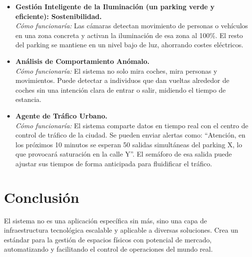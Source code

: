 \documentclass[12pt,a4paper]{article}
\begin{document}
	\begin{itemize}
		\item \textbf{Gestión Inteligente de la Iluminación (un parking verde y eficiente): Sostenibilidad.}\\
		\textit{Cómo funcionaría:} Las cámaras detectan movimiento de personas o vehículos en una zona concreta 
		y activan la iluminación de esa zona al 100\%. El resto del parking se mantiene en un nivel bajo de luz, 
		ahorrando costes eléctricos.
		
		\item \textbf{Análisis de Comportamiento Anómalo.}\\
		\textit{Cómo funcionaría:} El sistema no solo mira coches, mira personas y movimientos. 
		Puede detectar a individuos que dan vueltas alrededor de coches sin una intención clara de entrar o salir, 
		midiendo el tiempo de estancia.
		
		\item \textbf{Agente de Tráfico Urbano.}\\
		\textit{Cómo funcionaría:} El sistema comparte datos en tiempo real con el centro de control de tráfico de la ciudad. 
		Se pueden enviar alertas como: “Atención, en los próximos 10 minutos se esperan 50 salidas simultáneas del parking X, 
		lo que provocará saturación en la calle Y”. El semáforo de esa salida puede ajustar sus tiempos de forma anticipada 
		para fluidificar el tráfico.
	\end{itemize}
	
	\section{Conclusión}
	
	El sistema no es una aplicación específica sin más, sino una capa de infraestructura tecnológica escalable 
	y aplicable a diversas soluciones. Crea un estándar para la gestión de espacios físicos con potencial de mercado, 
	automatizando y facilitando el control de operaciones del mundo real.
	
\end{document}

